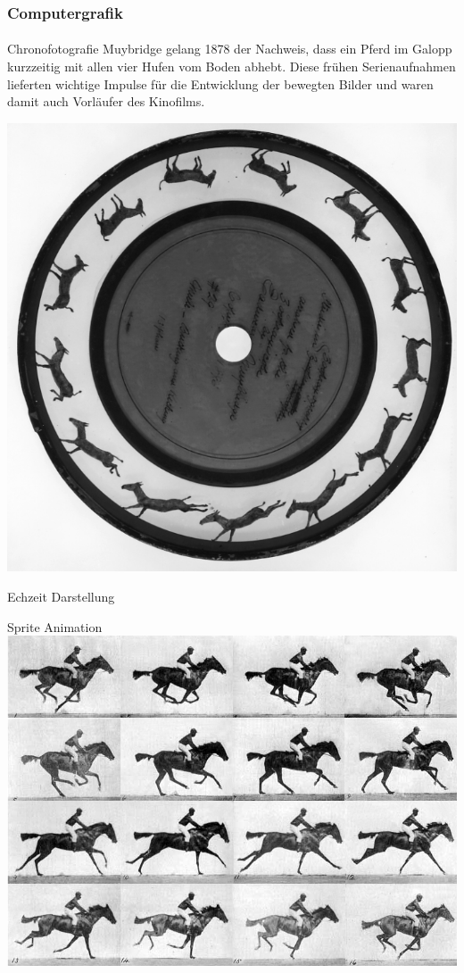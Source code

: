 \documentclass{beamer}
\begin{document}
\begin{frame}
    \frametitle{Computergrafik}
\framesubtitle{}
    \begin{block}{Chronofotografie}
        Muybridge gelang 1878 der Nachweis, dass ein Pferd im Galopp kurzzeitig mit allen vier Hufen vom Boden abhebt. Diese frühen Serienaufnahmen lieferten wichtige Impulse für die Entwicklung der bewegten Bilder und waren damit auch Vorläufer des Kinofilms. 
    \end{block}
    \begin{center}
        
        \includegraphics[scale=0.36]{images/Zoopraxiscope.jpg}
    \end{center}
   
\end{frame}


\begin{frame}{Echzeit Darstellung}
    \begin{block}{Sprite Animation}
    \includegraphics[scale=0.4]{images/horse} 
\end{block}

\end{frame}
\end{document}
